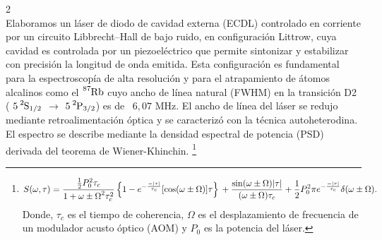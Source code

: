 \documentclass[11pt,spanish]{article}
\newcommand{\seccion}[1]{\noindent {\Large\textbf{#1}}\\}
\begin{document}
\begin{multicols}{2}
\seccion{Desarrollo}
Elaboramos un láser de diodo de cavidad externa (ECDL) controlado en corriente por un circuito Libbrecht–Hall de bajo ruido, en configuración Littrow, cuya cavidad es controlada por un piezoeléctrico que permite sintonizar y estabilizar con precisión la longitud de onda emitida. Esta configuración
es fundamental para la espectroscopía de alta resolución y para el atrapamiento de átomos alcalinos como el $\ce{^{87}_{}Rb}$ cuyo ancho de línea natural (FWHM) en la transición D2 ( $\ce{5^{2}S_{1/2}}$ $\rightarrow$ $\ce{5^{2}P_{3/2}}$) es de ~$6,07$ MHz. El ancho de línea del láser se redujo mediante retroalimentación óptica y se caracterizó con la técnica autoheterodina. El espectro se describe mediante la densidad espectral de potencia (PSD) derivada del teorema de Wiener-Khinchin. \footnote{
  
  \begin{minipage}{\textwidth}
    \begin{equation}
      S(\omega, \tau) = \frac{\frac{1}{2} P_0^2 \tau_c}{1 + {\omega \pm \Omega}^2 \tau_c^2} \left\{ 1 - e^{-\frac{-|\tau|}{\tau_c}} [\cos(\omega \pm \Omega)] \tau \right\} 
      \\ + \frac{\sin(\omega \pm \Omega) |\tau|}{(\omega \pm \Omega) \tau_c} + \frac{1}{2} P_0^2 \pi e^{-\frac{-|\tau|}{\tau_c}} \delta(\omega \pm \Omega).
    \end{equation}Donde, $\tau_c$ es el tiempo de coherencia, $\Omega$ es el desplazamiento de frecuencia de un modulador acusto óptico (AOM) y $P_0$ es la potencia del láser.
  \end{minipage}
  }


\end{multicols}
\end{document}
